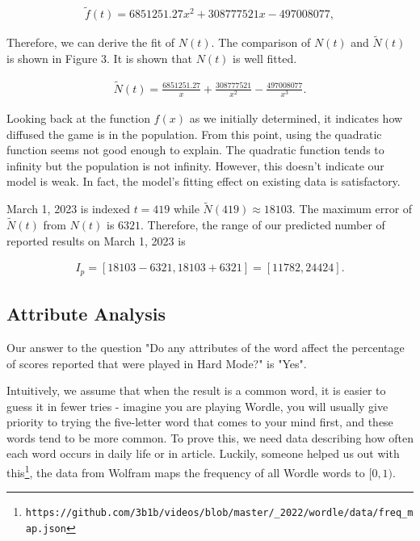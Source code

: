 \begin{equation}
	\begin{aligned}
		\tilde{f}(t) = 6851251.27x^2+308777521x-497008077,
	\end{aligned}
\end{equation}


Therefore, we can derive the fit of $N(t)$. The comparison of $N(t)$ and $\tilde{N}(t)$ is shown in Figure 3. It is shown that $N(t)$ is well fitted.

\begin{equation}
	\begin{aligned}
		\tilde{N}(t) = \frac{6851251.27}{x}+\frac{308777521}{x^2}-\frac{497008077}{x^3}.
	\end{aligned}
\end{equation}

Looking back at the function $f(x)$ as we initially determined, it indicates how diffused the game is in the population. From this point, using the quadratic function seems not good enough to explain. The quadratic function tends to infinity but the population is not infinity. However, this doesn't indicate our model is weak. In fact, the model's fitting effect on existing data is satisfactory.

March 1, 2023 is indexed $t = 419$ while $\tilde{N}(419) \approx 18103$. The maximum error of $\tilde{N}(t)$ from $N(t)$ is $6321$. Therefore, the range of our predicted number of reported results on March 1, 2023 is

\begin{equation}
	\begin{aligned}
		I_p=[18103-6321,18103+6321]=[11782,24424].
	\end{aligned}
\end{equation}

\subsection{Attribute Analysis}

Our answer to the question "Do any attributes of the word affect the percentage of scores reported that were played in Hard Mode?" is "Yes".

Intuitively, we assume that when the result is a common word, it is easier to guess it in fewer tries - imagine you are playing Wordle, you will usually give priority to trying the five-letter word that comes to your mind first, and these words tend to be more common. To prove this, we need data describing how often each word occurs in daily life or in article. Luckily, someone helped us out with this\footnote{\tt https://github.com/3b1b/videos/blob/master/\_2022/wordle/data/freq\_map.json}, the data from Wolfram maps the frequency of all Wordle words to $[0, 1)$.

